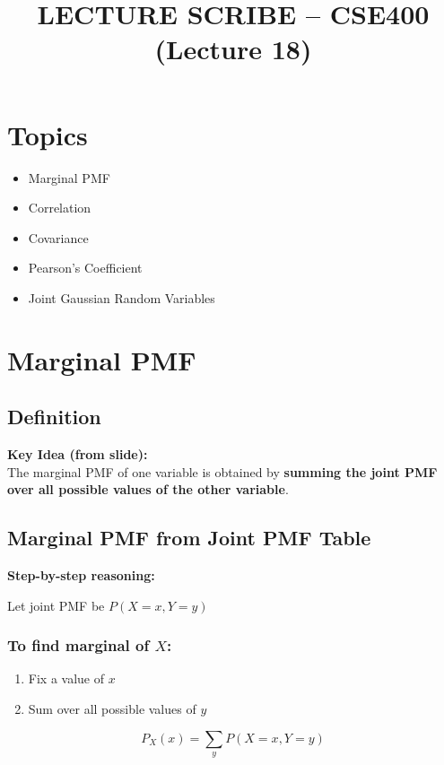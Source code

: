\documentclass[12pt]{article}
\title{LECTURE SCRIBE – CSE400 (Lecture 18)}
\date{}
\begin{document}
\maketitle

\section*{Topics}
\begin{itemize}
    \item Marginal PMF
    \item Correlation
    \item Covariance
    \item Pearson’s Coefficient
    \item Joint Gaussian Random Variables
\end{itemize}

\section{Marginal PMF}

\subsection*{Definition}

\textbf{Key Idea (from slide):} \\
The marginal PMF of one variable is obtained by \textbf{summing the joint PMF over all possible values of the other variable}.

\subsection*{Marginal PMF from Joint PMF Table}

\textbf{Step-by-step reasoning:}

Let joint PMF be $P(X = x, Y = y)$

\subsubsection*{To find marginal of $X$:}

\begin{enumerate}
    \item Fix a value of $x$
    \item Sum over all possible values of $y$
\end{enumerate}

\[
P_X(x) = \sum_y P(X=x, Y=y)
\]
\end{document}
